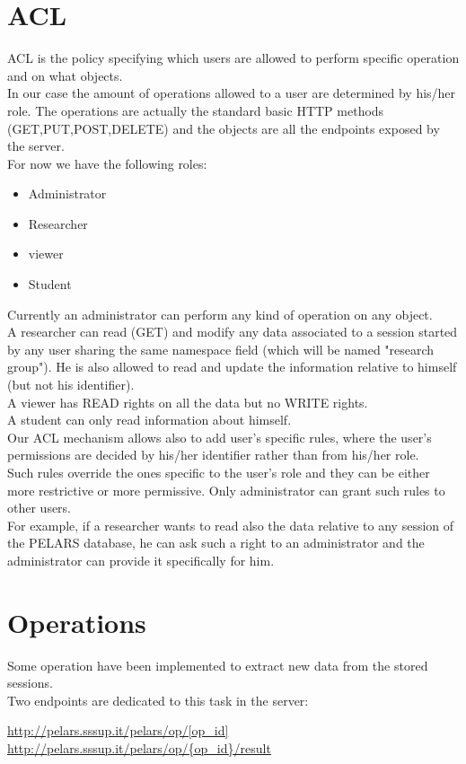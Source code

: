 \documentclass[a4paper,notitlepage,onecolumn]{hitec}  %
\begin{document}
\section{ACL}
\ac{ACL} is the policy specifying which users are allowed to perform specific operation and on what objects.\\
In our case the amount of operations allowed to a user are determined by his/her role. The operations are actually the standard basic HTTP methods (GET,PUT,POST,DELETE) and the objects are all the endpoints exposed by the server.\\
For now we have the following roles: 
\begin{itemize}
\item Administrator
\item Researcher
\item viewer
\item Student
\end{itemize}
Currently an administrator can perform any kind of operation on any object. \\A researcher can read (GET) and modify any data associated to a session started by any user sharing the same namespace field (which will be named "research group"). He is also allowed to read and update the information relative to himself (but not his identifier).\\
A viewer has READ rights on all the data but no WRITE rights.\\
A student can only read information about himself.\\
Our \ac{ACL} mechanism allows also to add user's specific rules, where the user's permissions are decided by his/her identifier rather than from his/her role.\\
Such rules override the ones specific to the user's role and they can be either more restrictive or more permissive. Only administrator can grant such rules to other users.\\
For example, if a researcher wants to read  also the data relative to any session of the PELARS database, he can ask such a right to an administrator and the administrator can provide it specifically for him.

\section{Operations}
Some operation have been implemented to extract new data from the stored sessions.\\
Two endpoints are dedicated to this task in the server:
\begin{center}
\url{http://pelars.sssup.it/pelars/op/[op\_id]}  \url{http://pelars.sssup.it/pelars/op/{op\_id}/result}
\end{center}
\end{document}

